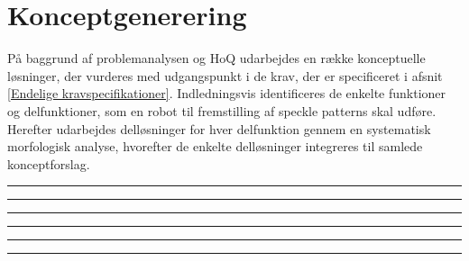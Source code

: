\chapter{Konceptgenerering} \label{Konceptgenerering}
På baggrund af problemanalysen og HoQ udarbejdes en række konceptuelle løsninger, der vurderes med udgangspunkt i de krav, der er specificeret i afsnit \ref{Endelige kravspecifikationer}. Indledningsvis identificeres de enkelte funktioner og delfunktioner, som en robot til fremstilling af speckle patterns skal udføre. Herefter udarbejdes delløsninger for hver delfunktion gennem en systematisk morfologisk analyse, hvorefter de enkelte delløsninger integreres til samlede konceptforslag. 
 

\plainbreak{2}

 
\plainbreak{2}
 


\plainbreak{2}


\plainbreak{2}


\plainbreak{2}

\plainbreak{2}
